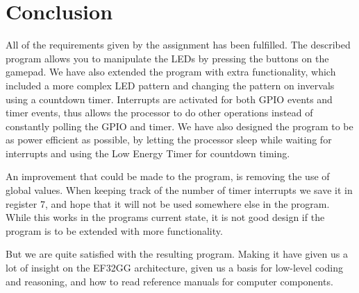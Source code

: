 \section{Conclusion}
All of the requirements given by the assignment has been fulfilled. The described program allows you to manipulate the LEDs by pressing the buttons on the gamepad. We have also extended the program with extra functionality, which included a more complex LED pattern and changing the pattern on invervals using a countdown timer. Interrupts are activated for both GPIO events and timer events, thus allows the processor to do other operations instead of constantly polling the GPIO and timer. 
We have also designed the program to be as power efficient as possible, by letting the processor sleep while waiting for interrupts and using the Low Energy Timer for countdown timing. 

An improvement that could be made to the program, is removing the use of global values. When keeping track of the number of timer interrupts we save it in register 7, and hope that it will not be used somewhere else in the program. While this works in the programs current state, it is not good design if the program is to be extended with more functionality. 

But we are quite satisfied with the resulting program. Making it have given us a lot of insight on the EF32GG architecture, given us a basis for low-level coding and reasoning, and how to read reference manuals for computer components. 